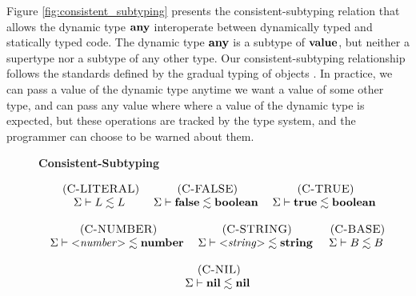 Figure \ref{fig:consistent_subtyping} presents the consistent-subtyping
relation that allows the dynamic type $\mathbf{any}$ interoperate between
dynamically typed and statically typed code.
The dynamic type $\mathbf{any}$ is a subtype of $\mathbf{value}$, but neither a
supertype nor a subtype of any other type.
Our consistent-subtyping relationship follows the standards defined
by the gradual typing of objects \citep{siek2007objects,siek2013mutable}.
In practice, we can pass a value of the dynamic type anytime we want
a value of some other type, and can pass any value where where a
value of the dynamic type is expected, but these operations are tracked
by the type system, and the programmer can choose to be warned about them.

\begin{figure}[!ht]
\textbf{Consistent-Subtyping}\\
\dstart
\begin{footnotesize}
$$
\begin{array}{c}
\begin{array}{c}
\mylabel{C-LITERAL}\\
\senv \vdash L \lesssim L
\end{array}
\;
\begin{array}{c}
\mylabel{C-FALSE}\\
\senv \vdash \False \lesssim \Boolean
\end{array}
\;
\begin{array}{c}
\mylabel{C-TRUE}\\
\senv \vdash \True \lesssim \Boolean
\end{array}
\\ \\
\begin{array}{c}
\mylabel{C-NUMBER}\\
\senv \vdash {<}{\it number}{>} \lesssim \Number
\end{array}
\;
\begin{array}{c}
\mylabel{C-STRING}\\
\senv \vdash {<}{\it string}{>} \lesssim \String
\end{array}
\;
\begin{array}{c}
\mylabel{C-BASE}\\
\senv \vdash B \lesssim B
\end{array}
\\ \\
\begin{array}{c}
\mylabel{C-NIL}\\
\senv \vdash \Nil \lesssim \Nil
\end{array}

\end{array}$$
\end{footnotesize}
\end{figure}
